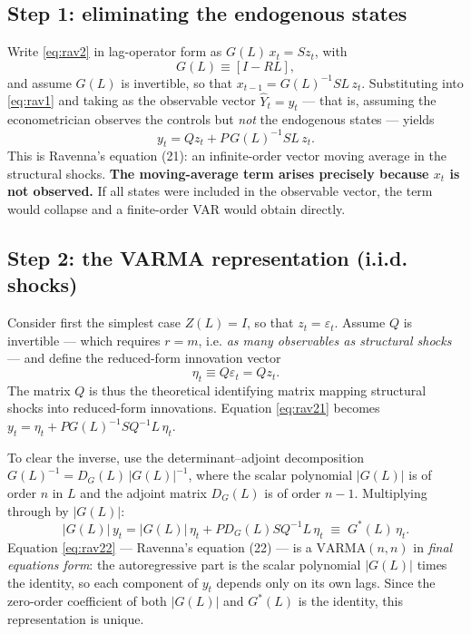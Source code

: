 \subsection{Step 1: eliminating the endogenous states}

Write \eqref{eq:rav2} in lag-operator form as $G(L)\, x_t = S z_t$, with
\begin{equation}
    G(L) \equiv [I - R L],
\end{equation}
and assume $G(L)$ is invertible, so that
$x_{t-1} = G(L)^{-1} S L\, z_t$. Substituting into \eqref{eq:rav1} and
taking as the observable vector $\widehat{Y}_t = y_t$ --- that is,
assuming the econometrician observes the controls but \emph{not} the
endogenous states --- yields
\begin{equation}
    y_t = Q z_t + P\, G(L)^{-1} S L\, z_t.
    \label{eq:rav21}
\end{equation}
This is Ravenna's equation (21): an infinite-order vector moving average
in the structural shocks. \textbf{The moving-average term arises precisely
because $x_t$ is not observed.} If all states were included in the
observable vector, the term would collapse and a finite-order VAR would
obtain directly.

\subsection{Step 2: the VARMA representation (i.i.d. shocks)}

Consider first the simplest case $Z(L) = I$, so that $z_t =
\varepsilon_t$. Assume $Q$ is invertible --- which requires $r = m$, i.e.
\emph{as many observables as structural shocks} --- and define the
reduced-form innovation vector
\begin{equation}
    \eta_t \equiv Q \varepsilon_t = Q z_t .
\end{equation}
The matrix $Q$ is thus the theoretical identifying matrix mapping
structural shocks into reduced-form innovations. Equation
\eqref{eq:rav21} becomes
$y_t = \eta_t + P G(L)^{-1} S Q^{-1} L\, \eta_t$.

To clear the inverse, use the determinant--adjoint decomposition
$G(L)^{-1} = D_G(L)\,|G(L)|^{-1}$, where the scalar polynomial $|G(L)|$
is of order $n$ in $L$ and the adjoint matrix $D_G(L)$ is of order $n-1$.
Multiplying through by $|G(L)|$:
\begin{equation}
    |G(L)|\, y_t = |G(L)|\, \eta_t + P D_G(L) S Q^{-1} L\, \eta_t
    \;\equiv\; G^{*}(L)\, \eta_t .
    \label{eq:rav22}
\end{equation}
Equation \eqref{eq:rav22} --- Ravenna's equation (22) --- is a
$\mathrm{VARMA}(n,n)$ in \emph{final equations form}: the autoregressive
part is the scalar polynomial $|G(L)|$ times the identity, so each
component of $y_t$ depends only on its own lags. Since the zero-order
coefficient of both $|G(L)|$ and $G^{*}(L)$ is the identity, this
representation is unique.


